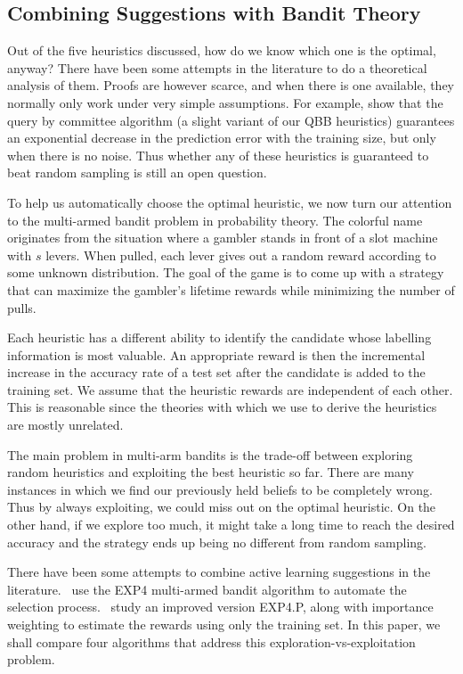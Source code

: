 \documentclass[fleqn,10pt,lineno]{wlpeerj} %
\begin{document}
\subsection*{Combining Suggestions with Bandit Theory}

Out of the five heuristics discussed, how do we know which one is the optimal,
anyway? There have been some attempts in the literature to do a theoretical
analysis of them. Proofs are however scarce, and when there is one available,
they normally only work under very simple assumptions. For example,
\cite{freund97} show that the query by committee algorithm (a slight variant of
our QBB heuristics) guarantees an exponential decrease in the prediction error
with the training size, but only when there is no noise. Thus whether any of
these heuristics is guaranteed to beat random sampling is still an open
question.

To help us automatically choose the optimal heuristic, we now turn our
attention to the multi-armed bandit problem in probability theory. The
colorful name originates from the situation where a gambler stands in front of
a slot machine with $s$ levers. When pulled, each lever gives out a random
reward according to some unknown distribution. The goal of the game is to come
up with a strategy that can maximize the gambler's lifetime rewards while
minimizing the number of pulls.

Each heuristic has a different ability to identify the candidate whose
labelling information is most valuable. An appropriate reward is then the
incremental increase in the accuracy rate of a test set after the candidate is
added to the training set. We assume that the heuristic rewards are independent
of each other. This is reasonable since the theories with which we use to
derive the heuristics are mostly unrelated.

The main problem in multi-arm bandits is the trade-off between exploring random
heuristics and exploiting the best heuristic so far. There are many instances
in which we find our previously held beliefs to be completely wrong. Thus by
always exploiting, we could miss out on the optimal heuristic. On the other
hand, if we explore too much, it might take a long time to reach the desired
accuracy and the strategy ends up being no different from random sampling.

There have been some attempts to combine active learning suggestions in the
literature.~\cite{baram04} use the EXP4 multi-armed bandit algorithm to
automate the selection process.~\cite{hsu15} study an improved version
EXP4.P, along with importance weighting to estimate the rewards using only the
training set. In this paper, we shall compare four algorithms that address this
exploration-vs-exploitation problem.
\end{document}
